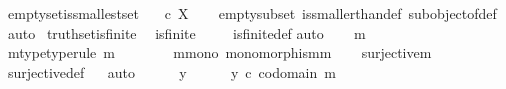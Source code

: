 \begin{isabellebody}
\endisatagproof
{\isafoldproof}%
%
\isadelimproof
\isanewline
%
\endisadelimproof
\isanewline
{}\isamarkupfalse%
\ emptyset{\isacharunderscore}{\kern0pt}is{\isacharunderscore}{\kern0pt}smallest{\isacharunderscore}{\kern0pt}set{\isacharcolon}{\kern0pt}\isanewline
\ \ {\isachardoublequoteopen}{\isasymemptyset}\ {\isasymle}\isactrlsub c\ X{\isachardoublequoteclose}\isanewline
%
\isadelimproof
\ \ %
\endisadelimproof
%
\isatagproof
{}\isamarkupfalse%
\ empty{\isacharunderscore}{\kern0pt}subset\ is{\isacharunderscore}{\kern0pt}smaller{\isacharunderscore}{\kern0pt}than{\isacharunderscore}{\kern0pt}def\ subobject{\isacharunderscore}{\kern0pt}of{\isacharunderscore}{\kern0pt}def{}\ \isamarkupfalse%
\ auto%
\endisatagproof
{\isafoldproof}%
%
\isadelimproof
\isanewline
%
\endisadelimproof
\isanewline
{}\isamarkupfalse%
\ truth{\isacharunderscore}{\kern0pt}set{\isacharunderscore}{\kern0pt}is{\isacharunderscore}{\kern0pt}finite{\isacharcolon}{\kern0pt}\isanewline
\ \ {\isachardoublequoteopen}is{\isacharunderscore}{\kern0pt}finite\ {\isasymOmega}{\isachardoublequoteclose}\isanewline
%
\isadelimproof
\ \ %
\endisadelimproof
%
\isatagproof
{}\isamarkupfalse%
\ is{\isacharunderscore}{\kern0pt}finite{\isacharunderscore}{\kern0pt}def\isanewline
{}\isamarkupfalse%
{\isacharparenleft}{\kern0pt}auto{\isacharparenright}{\kern0pt}\isanewline
\ \ \isamarkupfalse%
\ m\ \isanewline
\ \ \isamarkupfalse%
\ m{\isacharunderscore}{\kern0pt}type{\isacharbrackleft}{\kern0pt}type{\isacharunderscore}{\kern0pt}rule{\isacharbrackright}{\kern0pt}{\isacharcolon}{\kern0pt}\ {\isachardoublequoteopen}m\ {\isacharcolon}{\kern0pt}\ {\isasymOmega}\ {\isasymrightarrow}\ {\isasymOmega}{\isachardoublequoteclose}\isanewline
\ \ \isamarkupfalse%
\ m{\isacharunderscore}{\kern0pt}mono{\isacharcolon}{\kern0pt}\ {\isachardoublequoteopen}monomorphism{\isacharparenleft}{\kern0pt}m{\isacharparenright}{\kern0pt}{\isachardoublequoteclose}\isanewline
\ \ \isamarkupfalse%
\ {\isachardoublequoteopen}surjective{\isacharparenleft}{\kern0pt}m{\isacharparenright}{\kern0pt}{\isachardoublequoteclose}\isanewline
\ \ \ \ \isamarkupfalse%
\ surjective{\isacharunderscore}{\kern0pt}def\isanewline
\ \ \isamarkupfalse%
{\isacharparenleft}{\kern0pt}auto{\isacharparenright}{\kern0pt}\isanewline
\ \ \ \ \isamarkupfalse%
\ y\isanewline
\ \ \ \ \isamarkupfalse%
\ {\isachardoublequoteopen}y\ {\isasymin}\isactrlsub c\ codomain\ m{\isachardoublequoteclose}\ \isanewline

\end{isabellebody}
